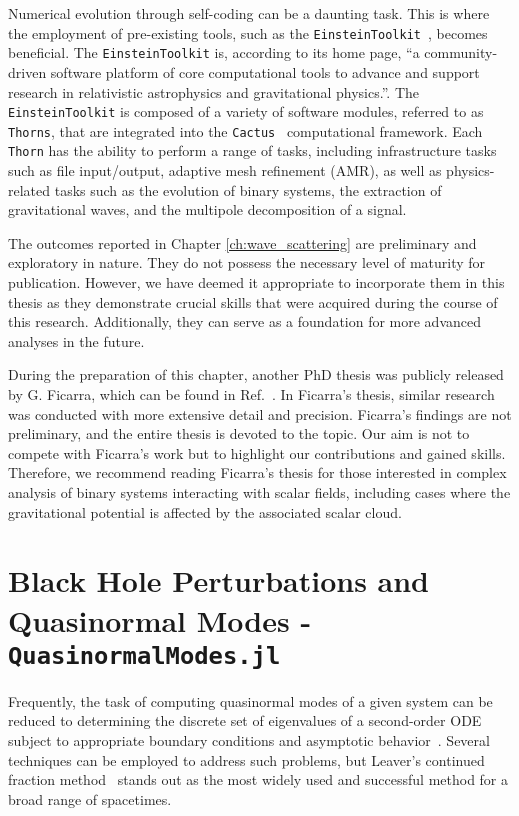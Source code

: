 Numerical evolution through self-coding can be a daunting task. This is where the employment of pre-existing tools, such as the \texttt{EinsteinToolkit}~\cite{EinsteinToolkit:2022_11}, becomes beneficial. The \texttt{EinsteinToolkit} is, according to its home page, ``a community-driven software platform of core computational tools to advance and support research in relativistic astrophysics and gravitational physics.''. The \texttt{EinsteinToolkit} is composed of a variety of software modules, referred to as \texttt{Thorns}, that are integrated into the \texttt{Cactus}~\cite{Goodale:2002a} computational framework. Each \texttt{Thorn} has the ability to perform a range of tasks, including infrastructure tasks such as file input/output, adaptive mesh refinement (\ac{AMR}), as well as physics-related tasks such as the evolution of binary systems, the extraction of gravitational waves, and the multipole decomposition of a signal.

The outcomes reported in Chapter \ref{ch:wave_scattering} are preliminary and exploratory in nature. They do not possess the necessary level of maturity for publication. However, we have deemed it appropriate to incorporate them in this thesis as they demonstrate crucial skills that were acquired during the course of this research. Additionally, they can serve as a foundation for more advanced analyses in the future.

During the preparation of this chapter, another PhD thesis was publicly released by G. Ficarra, which can be found in Ref.~\cite{Ficarra2023}. In Ficarra's thesis, similar research was conducted with more extensive detail and precision. Ficarra's findings are not preliminary, and the entire thesis is devoted to the topic. Our aim is not to compete with Ficarra's work but to highlight our contributions and gained skills. Therefore, we recommend reading Ficarra's thesis for those interested in complex analysis of binary systems interacting with scalar fields, including cases where the gravitational potential is affected by the associated scalar cloud.

\section{Black Hole Perturbations and Quasinormal Modes - \texttt{QuasinormalModes.jl}}

Frequently, the task of computing quasinormal modes of a given system can be reduced to determining the discrete set of eigenvalues of a second-order \ac{ODE} subject to appropriate boundary conditions and asymptotic behavior~\cite{review3}. Several techniques can be employed to address such problems, but Leaver's continued fraction method~\cite{Leaver1985} stands out as the most widely used and successful method for a broad range of spacetimes.

